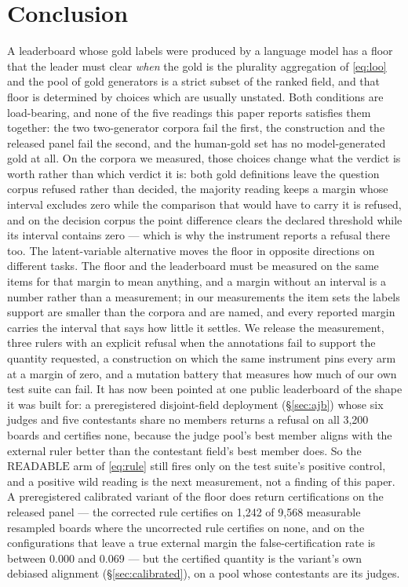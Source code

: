 \documentclass{article}
\begin{document}
\section{Conclusion} A leaderboard whose gold labels were produced by a language model has a floor that the leader must clear \emph{when} the gold is the plurality aggregation of \eqref{eq:loo} and the pool of gold generators is a strict subset of the ranked field, and that floor is determined by choices which are usually unstated. Both conditions are load-bearing, and none of the five readings this paper reports satisfies them together: the two two-generator corpora fail the first, the construction and the released panel fail the second, and the human-gold set has no model-generated gold at all. On the corpora we measured, those choices change what the verdict is worth rather than which verdict it is: both gold definitions leave the question corpus refused rather than decided, the majority reading keeps a margin whose interval excludes zero while the comparison that would have to carry it is refused, and on the decision corpus the point difference clears the declared threshold while its interval contains zero --- which is why the instrument reports a refusal there too. The latent-variable alternative moves the floor in opposite directions on different tasks. The floor and the leaderboard must be measured on the same items for that margin to mean anything, and a margin without an interval is a number rather than a measurement; in our measurements the item sets the labels support are smaller than the corpora and are named, and every reported margin carries the interval that says how little it settles. We release the measurement, three rulers with an explicit refusal when the annotations fail to support the quantity requested, a construction on which the same instrument pins every arm at a margin of zero, and a mutation battery that measures how much of our own test suite can fail. It has now been pointed at one public leaderboard of the shape it was built for: a preregistered disjoint-field deployment (\S\ref{sec:ajb}) whose six judges and five contestants share no members returns a refusal on all 3,200 boards and certifies none, because the judge pool's best member aligns with the external ruler better than the contestant field's best member does. So the $\mathrm{READABLE}$ arm of \eqref{eq:rule} still fires only on the test suite's positive control, and a positive wild reading is the next measurement, not a finding of this paper. A preregistered calibrated variant of the floor does return certifications on the released panel --- the corrected rule certifies on 1,242 of 9,568 measurable resampled boards where the uncorrected rule certifies on none, and on the configurations that leave a true external margin the false-certification rate is between 0.000 and 0.069 --- but the certified quantity is the variant's own debiased alignment (\S\ref{sec:calibrated}), on a pool whose contestants are its judges. %
\end{document}
